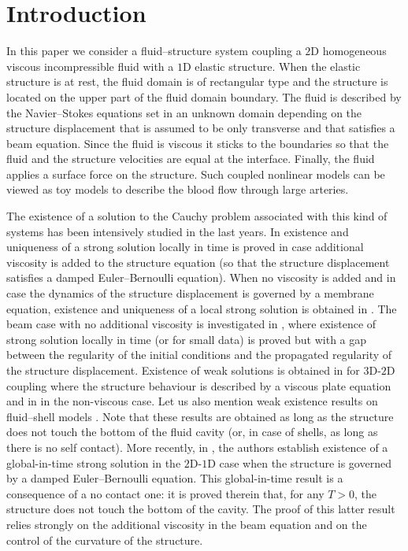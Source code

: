 \section{Introduction}

In this paper we consider a fluid--structure system coupling a $2$D homogeneous viscous incompressible fluid with a $1$D
elastic structure. When the elastic structure is at rest, the fluid domain is of rectangular type and the structure is located on the upper part of the fluid domain boundary. The fluid is described by the Navier--Stokes equations set in an unknown domain depending on the structure displacement that is assumed to be only transverse and that satisfies a beam equation. Since the fluid is viscous it sticks to the boundaries so that the fluid and the structure velocities are equal at the interface. Finally, the fluid applies a surface force on the structure. Such coupled nonlinear models can be viewed as toy models to describe the blood flow through large arteries.\enlargethispage{\baselineskip}%

The existence of a solution to the Cauchy problem associated with this kind of systems has been intensively studied in the last years. In \cite{DaVeiga, Lequeurre11, Lequeurre13} existence and uniqueness of a strong solution locally in time is proved in case additional viscosity is added to the structure equation (so that the structure displacement satisfies a damped Euler--Bernoulli equation). When no viscosity is added and in case the dynamics of the structure displacement is governed by a membrane equation, existence and uniqueness of a local strong solution is obtained in \cite{Grandmont-Hillairet-Lequeurre}. The beam case with no additional viscosity is investigated in \cite{Badra-Takahashi}, where existence of strong solution locally in time (or for small data) is proved but with a gap between the regularity of the initial conditions and the propagated regularity of the structure displacement. Existence of weak solutions is obtained in \cite{Chambolle-etal} for $3$D-$2$D coupling where the structure behaviour is described by a viscous plate equation and in \cite{Grandmont08, Muha-Canic13} in the non-viscous case. Let us also mention weak existence results on fluid--shell models \cite{Lengeler, Muha-Schwarzacher}. Note that these results are obtained as long as the structure does not touch the bottom of the fluid cavity (or, in case of shells, as long as there is no self contact). More recently, in \cite{Grandmont-Hillairet}, the authors establish existence of a global-in-time strong solution in the $2$D-$1$D case when the structure is governed by a damped Euler--Bernoulli equation. This global-in-time result is a consequence of a no contact one: it is proved therein that, for any $T>0$, the structure does not touch the bottom of the cavity. The proof of this latter result relies strongly on the additional viscosity in the beam equation and on the control of the curvature of the structure.

